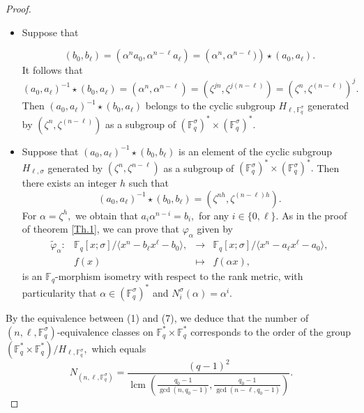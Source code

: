 \documentclass[12pt,paper]{article}
\theoremstyle{plain}
\newcommand{\Fq}{\mathbb{F}_{q}}
\DeclareMathOperator{\lcm}{lcm}
\begin{document}
\begin{proof}
\begin{itemize}
\item[(6) $\Rightarrow$ (7):] Suppose that

$$  (b_0, b_{\ell} )= \left( \alpha^n a_0, \alpha^{n-\ell} a_{\ell}\right)=\left(\alpha^n, \alpha^{n-\ell})\right)\star (a_0, a_{\ell}).$$ 
It follows that
$$  (a_0,a_{\ell})^{-1}\star (b_0, a_{\ell})=  \left( \alpha^n, \alpha^{n-\ell} \right)= \left( \zeta^{jn}, \zeta^{j(n-\ell)}\right)= 
\left( \zeta^{n}, \zeta^{(n-\ell)}\right)^j .$$
Then $ (a_0,a_{\ell})^{-1}\star (b_0, a_{\ell}) $ belongs to the cyclic subgroup  $H_{\ell,\Fq^{\sigma}}$ generated by $  
\left( \zeta^{n}, \zeta^{(n-\ell)}\right) $  as a subgroup of $ (\Fq^{\sigma})^{*}\times (\Fq^{\sigma})^{*}.$

\item[(7) $\Rightarrow$ (1):]
     Suppose that $ (a_0,a_{\ell})^{-1}\star (b_0, b_{\ell}) $ is an element of the cyclic subgroup  $H_{\ell,\sigma}$ generated by 
     $  (\zeta^n, \zeta^{n-\ell})  $  as a subgroup of $ (\Fq^{\sigma})^{*}\times (\Fq^{\sigma})^{*}.$ Then there exists an integer $ h$ such that 
     $$ (a_0,a_{\ell})^{-1}\star (b_0, b_{\ell})=   \left( \zeta^{nh}, \zeta^{(n-\ell)h}\right).$$
    For $ \alpha=  \zeta^{h}, $ we obtain  that $  a_i \alpha^{n-i}= b_i, $ for any $ i\in \{ 0,\ell\}.$
As in the proof of theorem \ref{Th.1}, we can prove that $ \varphi_{\alpha}$ given by
  \begin{equation}
        \begin{array}{cccc}
        \tilde{\varphi}_{\alpha} : & \mathbb{F}_q[x;\sigma]/\langle x^n - b_{\ell} x^{\ell} - b_0 \rangle,   & \longrightarrow & \mathbb{F}_q[x;\sigma] /\langle x^n - a_{\ell} x^{\ell} - a_0 \rangle, \\ 
        & f(x) & \longmapsto & f(\alpha x),
        \end{array}
    \end{equation} 
    is an $\Fq$-morphism isometry with respect to the rank metric, with particularity that $ \alpha \in (\mathbb{F}_q^{\sigma})^* $ and $ N_i^{\sigma}(\alpha)= \alpha^i.$ 
\end{itemize}
By the equivalence between (1) and (7), we deduce that the number of $(n,\ell,\Fq^{\sigma})$-equivalence classes on $\Fq^*\times \Fq^*$ corresponds to the order of the group $ \left( \Fq^*\times \Fq^* \right)/H_{\ell,\Fq^{\sigma}},$ which equals 
$$ N_{(n,\ell,\Fq^{\sigma})}=\dfrac{ (q-1)^2}{ \lcm(\frac{q_0-1}{ \gcd(n,q_0-1)}, \frac{q_0-1}{ \gcd(n-\ell,q_0-1)})} . $$
 \end{proof}
\end{document}
